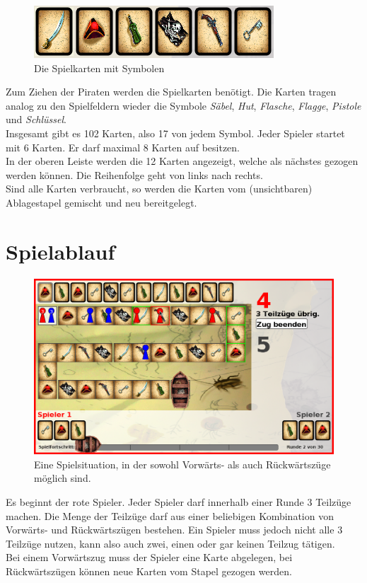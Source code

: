 \documentclass[a4paper, ngerman]{scrartcl}
\begin{document}
	\begin{figure}[h]
		\centering
		\includegraphics[scale = 0.5]{bilder/Karten}
		\caption{Die Spielkarten mit Symbolen}
		\label{fig:spielkarten}
	\end{figure}
	Zum Ziehen der Piraten werden die Spielkarten benötigt. Die Karten tragen
	analog zu den Spielfeldern wieder die Symbole \emph{Säbel},  \emph{Hut},
	\emph{Flasche}, \emph{Flagge}, \emph{Pistole} und
	\emph{Schlüssel}.\\
	Insgesamt gibt es 102 Karten, also 17 von jedem Symbol. Jeder Spieler startet
	mit 6 Karten. Er darf maximal 8 Karten auf besitzen.\\
	In der oberen Leiste werden die 12 Karten angezeigt, welche als
	nächstes gezogen werden können. Die Reihenfolge geht von links nach rechts.\\
	Sind alle Karten verbraucht, so werden die Karten vom (unsichtbaren)
	Ablagestapel gemischt und neu bereitgelegt.
\section{Spielablauf}
	
	\begin{figure}[h]
		\centering
		\includegraphics[scale=0.3]{bilder/Moves}
		\caption{Eine Spielsituation, in der sowohl Vorwärts- als auch Rückwärtszüge
		möglich sind.}
		\label{fig:PossibleMoves}
	\end{figure}
	
	Es beginnt der rote Spieler. Jeder Spieler darf innerhalb einer Runde 3
	Teilzüge machen. Die Menge der Teilzüge darf aus einer beliebigen Kombination
	von Vorwärts- und Rückwärtszügen bestehen. Ein Spieler muss jedoch nicht alle 3
	Teilzüge nutzen, kann also auch zwei, einen oder gar keinen Teilzug tätigen.\\
	Bei einem Vorwärtszug muss der Spieler eine Karte  abgelegen, bei
	Rückwärtszügen können neue Karten vom Stapel gezogen werden.
	
\end{document}

